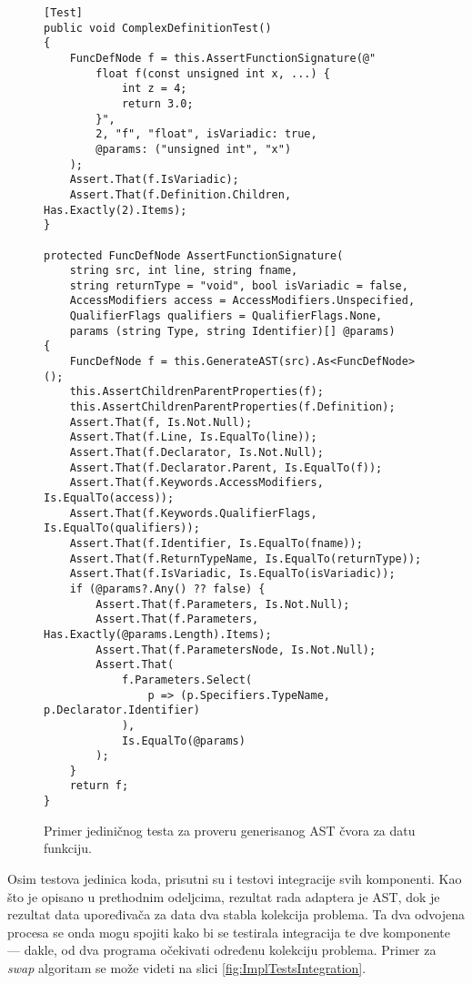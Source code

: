 \begin{figure}[h!]
\centering
\begin{lstlisting}
[Test]
public void ComplexDefinitionTest()
{
    FuncDefNode f = this.AssertFunctionSignature(@"
        float f(const unsigned int x, ...) {
            int z = 4;
            return 3.0;
        }", 
        2, "f", "float", isVariadic: true, 
        @params: ("unsigned int", "x")
    );
    Assert.That(f.IsVariadic);
    Assert.That(f.Definition.Children, Has.Exactly(2).Items);
}

protected FuncDefNode AssertFunctionSignature(
    string src, int line, string fname, 
    string returnType = "void", bool isVariadic = false, 
    AccessModifiers access = AccessModifiers.Unspecified,
    QualifierFlags qualifiers = QualifierFlags.None, 
    params (string Type, string Identifier)[] @params)
{
    FuncDefNode f = this.GenerateAST(src).As<FuncDefNode>();
    this.AssertChildrenParentProperties(f);
    this.AssertChildrenParentProperties(f.Definition);
    Assert.That(f, Is.Not.Null);
    Assert.That(f.Line, Is.EqualTo(line));
    Assert.That(f.Declarator, Is.Not.Null);
    Assert.That(f.Declarator.Parent, Is.EqualTo(f));
    Assert.That(f.Keywords.AccessModifiers, Is.EqualTo(access));
    Assert.That(f.Keywords.QualifierFlags, Is.EqualTo(qualifiers));
    Assert.That(f.Identifier, Is.EqualTo(fname));
    Assert.That(f.ReturnTypeName, Is.EqualTo(returnType));
    Assert.That(f.IsVariadic, Is.EqualTo(isVariadic));
    if (@params?.Any() ?? false) {
        Assert.That(f.Parameters, Is.Not.Null);
        Assert.That(f.Parameters, Has.Exactly(@params.Length).Items);
        Assert.That(f.ParametersNode, Is.Not.Null);
        Assert.That(
            f.Parameters.Select(
                p => (p.Specifiers.TypeName, p.Declarator.Identifier)
            ), 
            Is.EqualTo(@params)
        );
    }
    return f;
}
\end{lstlisting}
\caption{Primer jediničnog testa za proveru generisanog AST čvora za datu funkciju.}
\label{fig:ImplTestsUnit}
\end{figure}

Osim testova jedinica koda, prisutni su i testovi integracije svih komponenti. Kao što je opisano u prethodnim odeljcima, rezultat rada adaptera je AST, dok je rezultat data upoređivača za data dva stabla kolekcija problema. Ta dva odvojena procesa se onda mogu spojiti kako bi se testirala integracija te dve komponente --- dakle, od dva programa očekivati određenu kolekciju problema. Primer za \emph{swap} algoritam se može videti na slici \ref{fig:ImplTestsIntegration}.

